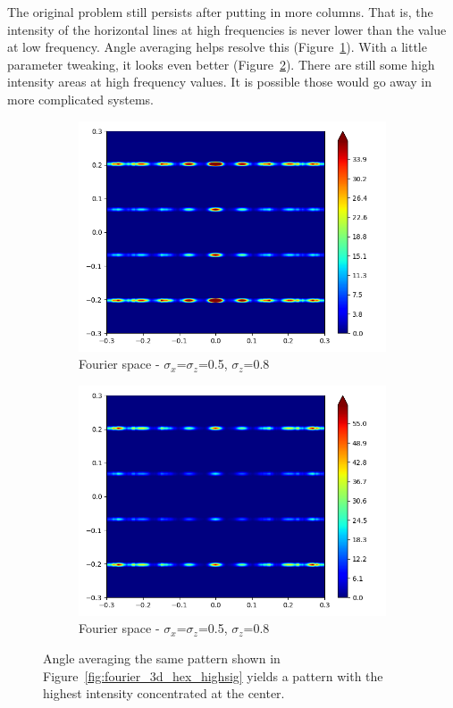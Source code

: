 \documentclass{article}
\begin{document}
The original problem still persists after putting in more columns. That is, the
intensity of the horizontal lines at high frequencies is never lower than the
value at low frequency. Angle averaging helps resolve this
(Figure~\ref{fig:fourier_hex_angle_average}). With a little parameter tweaking,
it looks even better (Figure~\ref{fig:fourier_hex_angle_average_better}). There 
are still some high intensity areas at high frequency values. It is possible 
those would go away in more complicated systems.

\begin{figure}
	\centering
	\begin{subfigure}{0.45\textwidth}
		\centering
		\includegraphics[width=\textwidth]{fourier_hex_angle_average.png}
		\caption{Fourier space - $\sigma_x$=$\sigma_z$=0.5, $\sigma_z$=0.8}\label{fig:fourier_hex_angle_average}
	\end{subfigure}
	\begin{subfigure}{0.45\textwidth}
		\centering
		\includegraphics[width=\textwidth]{fourier_hex_angle_average_better.png}
		\caption{Fourier space - $\sigma_x$=$\sigma_z$=0.5, $\sigma_z$=0.8}\label{fig:fourier_hex_angle_average_better}
	\end{subfigure}

	\caption{Angle averaging the same pattern shown in Figure~\ref{fig:fourier_3d_hex_highsig} 
	yields a pattern with the highest intensity concentrated at the center.}\label{fig:angle_averaged}
\end{figure}
\end{document}

